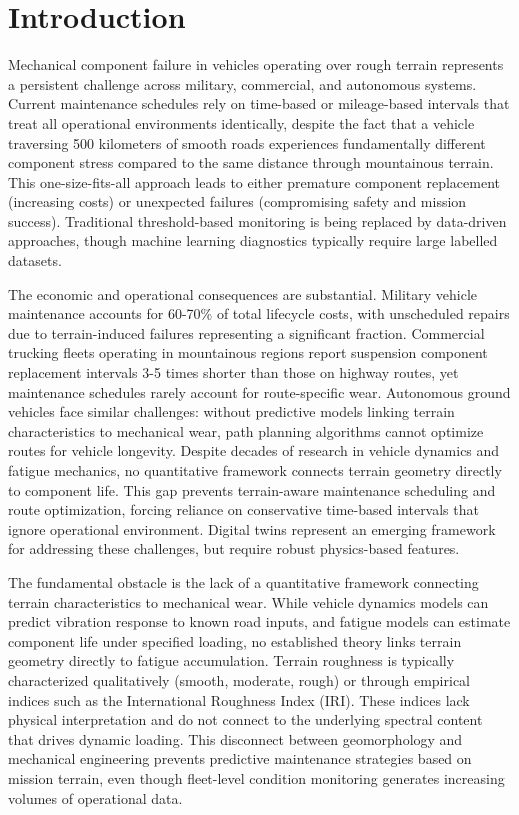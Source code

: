 \documentclass[11pt,letterpaper]{article}
\begin{document}
\newpage

\section{Introduction}

Mechanical component failure in vehicles operating over rough terrain represents a persistent challenge across military, commercial, and autonomous systems. Current maintenance schedules rely on time-based or mileage-based intervals that treat all operational environments identically, despite the fact that a vehicle traversing 500 kilometers of smooth roads experiences fundamentally different component stress compared to the same distance through mountainous terrain. This one-size-fits-all approach leads to either premature component replacement (increasing costs) or unexpected failures (compromising safety and mission success). Traditional threshold-based monitoring is being replaced by data-driven approaches\cite{Chen2024}, though machine learning diagnostics typically require large labelled datasets\cite{Lei2020}.

The economic and operational consequences are substantial. Military vehicle maintenance accounts for 60-70\% of total lifecycle costs, with unscheduled repairs due to terrain-induced failures representing a significant fraction. Commercial trucking fleets operating in mountainous regions report suspension component replacement intervals 3-5 times shorter than those on highway routes, yet maintenance schedules rarely account for route-specific wear. Autonomous ground vehicles face similar challenges: without predictive models linking terrain characteristics to mechanical wear, path planning algorithms cannot optimize routes for vehicle longevity\cite{Yurtsever2020}. Despite decades of research in vehicle dynamics and fatigue mechanics, no quantitative framework connects terrain geometry directly to component life. This gap prevents terrain-aware maintenance scheduling and route optimization, forcing reliance on conservative time-based intervals that ignore operational environment. Digital twins represent an emerging framework\cite{Li2023} for addressing these challenges, but require robust physics-based features.

The fundamental obstacle is the lack of a quantitative framework connecting terrain characteristics to mechanical wear. While vehicle dynamics models can predict vibration response to known road inputs\cite{Wong2022,Gillespie1992}, and fatigue models can estimate component life under specified loading\cite{Basquin1910,Dowling2013}, no established theory links terrain geometry directly to fatigue accumulation. Terrain roughness is typically characterized qualitatively (smooth, moderate, rough) or through empirical indices such as the International Roughness Index (IRI)\cite{ISO8608}. These indices lack physical interpretation and do not connect to the underlying spectral content that drives dynamic loading. This disconnect between geomorphology and mechanical engineering prevents predictive maintenance strategies based on mission terrain, even though fleet-level condition monitoring generates increasing volumes of operational data\cite{Zhu2019}.
\end{document}
